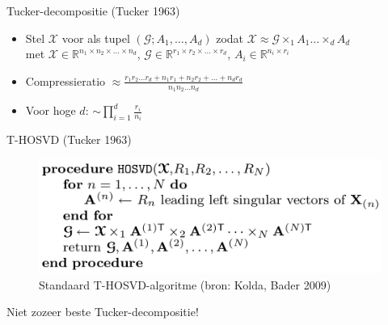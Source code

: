 \documentclass[t,12pt,dutch
\ifx\beamermode\undefined\else,\beamermode\fi
]{beamer}
\begin{document}
\begin{frame}{Tucker-decompositie (Tucker 1963)}

\begin{itemize}
\item Stel $\mathscr{X}$ voor als tupel $(\mathscr{G} ; A_1, \dots, A_d)$ zodat $\mathscr{X} \approx \mathscr{G} \times_1 A_1 \dots \times_d A_d$ 
\\met $\mathscr{X} \in \mathbb{R}^{n_1 \times n_2 \times \dots \times n_d}$, $\mathscr{G} \in \mathbb{R}^{r_1 \times r_2 \times \dots \times r_d}$, $A_i \in \mathbb{R}^{n_i \times r_i}$
\item Compressieratio $\approx \frac{r_1 r_2 \dots r_d + n_1 r_1 + n_2 r_2 + \dots + n_d r_d}{n_1 n_2 \dots n_d}$
\item Voor hoge $d$: $\sim \prod_{i=1}^{d}\frac{r_i}{n_i}$
\end{itemize}

\end{frame}

\begin{frame}{T-HOSVD (Tucker 1963)}

\begin{figure}[H]
\centering
\includegraphics[scale=0.3]{images/T-HOSVD.png}
\caption{Standaard T-HOSVD-algoritme (bron: Kolda, Bader 2009)}
\end{figure}

Niet zozeer beste Tucker-decompositie!

\end{frame}
\end{document}
